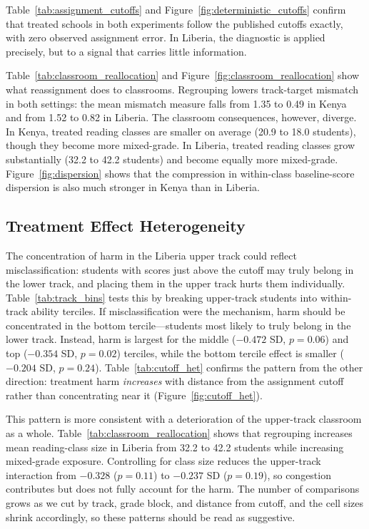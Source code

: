 \documentclass[11pt]{article}
\begin{document}
Table~\ref{tab:assignment_cutoffs} and Figure~\ref{fig:deterministic_cutoffs} confirm that treated schools in both experiments follow the published cutoffs exactly, with zero observed assignment error. In Liberia, the diagnostic is applied precisely, but to a signal that carries little information.

Table~\ref{tab:classroom_reallocation} and Figure~\ref{fig:classroom_reallocation} show what reassignment does to classrooms. Regrouping lowers track-target mismatch in both settings: the mean mismatch measure falls from 1.35 to 0.49 in Kenya and from 1.52 to 0.82 in Liberia. The classroom consequences, however, diverge. In Kenya, treated reading classes are smaller on average (20.9 to 18.0 students), though they become more mixed-grade. In Liberia, treated reading classes grow substantially (32.2 to 42.2 students) and become equally more mixed-grade. Figure~\ref{fig:dispersion} shows that the compression in within-class baseline-score dispersion is also much stronger in Kenya than in Liberia.

\subsection{Treatment Effect Heterogeneity}

The concentration of harm in the Liberia upper track could reflect misclassification: students with scores just above the cutoff may truly belong in the lower track, and placing them in the upper track hurts them individually. Table~\ref{tab:track_bins} tests this by breaking upper-track students into within-track ability terciles. If misclassification were the mechanism, harm should be concentrated in the bottom tercile---students most likely to truly belong in the lower track. Instead, harm is largest for the middle ($-0.472$ SD, $p = 0.06$) and top ($-0.354$ SD, $p = 0.02$) terciles, while the bottom tercile effect is smaller ($-0.204$ SD, $p = 0.24$). Table~\ref{tab:cutoff_het} confirms the pattern from the other direction: treatment harm \emph{increases} with distance from the assignment cutoff rather than concentrating near it (Figure~\ref{fig:cutoff_het}).

This pattern is more consistent with a deterioration of the upper-track classroom as a whole. Table~\ref{tab:classroom_reallocation} shows that regrouping increases mean reading-class size in Liberia from 32.2 to 42.2 students while increasing mixed-grade exposure. Controlling for class size reduces the upper-track interaction from $-0.328$ ($p = 0.11$) to $-0.237$ SD ($p = 0.19$), so congestion contributes but does not fully account for the harm. The number of comparisons grows as we cut by track, grade block, and distance from cutoff, and the cell sizes shrink accordingly, so these patterns should be read as suggestive.
\end{document}
